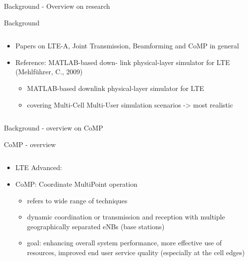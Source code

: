 \documentclass[xcolor={cmyk}]{beamer}
\begin{document}
 \begin{frame}{Background - Overview on research}
	 \begin{block}{Background}
	 	\begin{columns}
			\begin{column}{.9\textwidth}
				\begin{itemize}
					\item Papers on LTE-A, Joint Transmission, Beamforming and CoMP in general
					\item Reference: MATLAB-based down-
link physical-layer simulator for LTE (Mehlführer, C., 2009)
					\begin{itemize}
						\item MATLAB-based downlink physical-layer simulator for LTE
						\item covering Multi-Cell Multi-User simulation scenarios -> most realistic
					\end{itemize}
				\end{itemize}
			\end{column}
		\end{columns}
	 \end{block}
 \end{frame}
 
 \begin{frame}{Background - overview on CoMP}
 	\begin{block}{CoMP - overview}
		\begin{columns}
			\begin{column}{.9\textwidth}
				\begin{itemize}
					\item LTE Advanced:
					\item CoMP: Coordinate MultiPoint operation
					\begin{itemize}
						\item refers to wide range of techniques
						\item dynamic coordination or transmission and reception with multiple geographically separated eNBs (base stations)
						\item goal: enhancing overall system performance, more effective use of resources, improved end user service quality (especially at the cell edges)
					\end{itemize}
				\end{itemize}
			\end{column}
		\end{columns}
	 \end{block}
 \end{frame}
 
\end{document}

